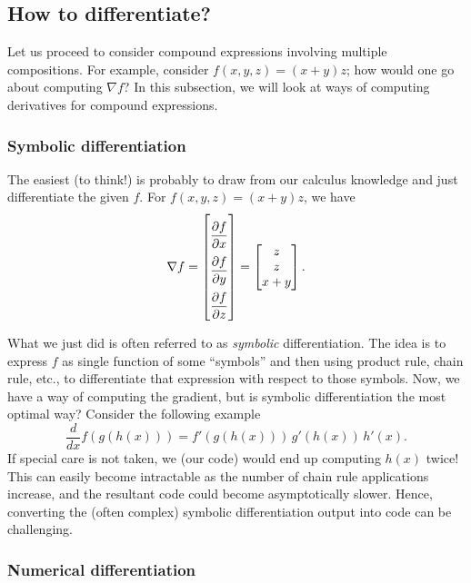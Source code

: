 \subsection{How to differentiate?}
\label{sec:2.2}

Let us proceed to consider compound expressions involving multiple compositions. For example, consider $f(x, y, z) = (x + y)z$; how would one go about computing $\nabla f$? In this subsection, we will look at ways of computing derivatives for compound expressions.

\subsubsection{Symbolic differentiation}
\label{sec:2.2.1}

The easiest (to think!) is probably to draw from our calculus knowledge and just differentiate the given $f$. For $f(x, y, z) = (x + y)z$, we have
$$
    \renewcommand{\arraystretch}{2.3}
    \nabla f = \begin{bmatrix}
    \dfrac{\partial f}{\partial x} \\
    \dfrac{\partial f}{\partial y} \\
    \dfrac{\partial f}{\partial z}
    \end{bmatrix} 
    \renewcommand{\arraystretch}{1}
    = \begin{bmatrix}
    z \\
    z \\
    x + y
    \end{bmatrix}.
    \renewcommand{\arraystretch}{1.5}
$$

What we just did is often referred to as \textit{symbolic} differentiation. The idea is to express $f$ as single function of some ``symbols'' and then using product rule, chain rule, etc., to differentiate that expression with respect to those symbols. Now, we have a way of computing the gradient, but is symbolic differentiation the most optimal way? Consider the following example 
$$
    \dfrac{d}{dx} f(g(h(x))) = f'(g(h(x)))\, g'(h(x))\, h'(x).
$$
If special care is not taken, we (our code) would end up computing $h(x)$ twice! This can easily become intractable as the number of chain rule applications increase, and the resultant code could become asymptotically slower. Hence, converting the (often complex) symbolic differentiation output into code can be challenging. 

\subsubsection{Numerical differentiation}
\label{sec:2.2.2}

